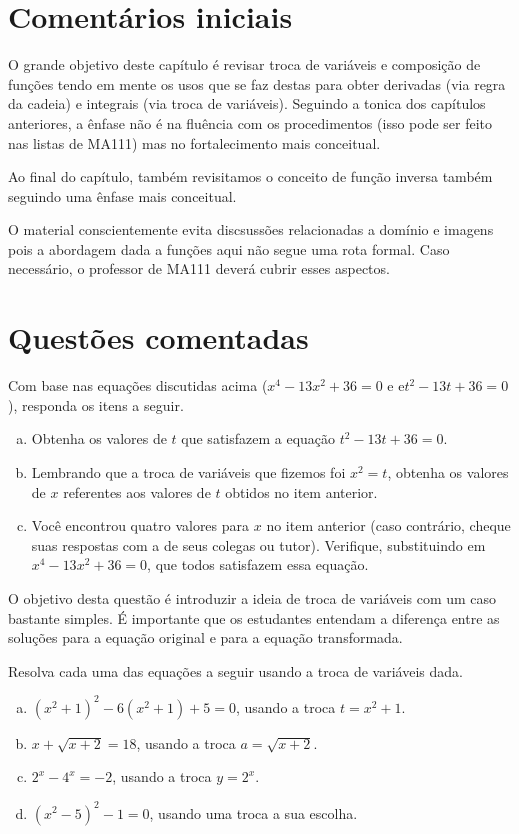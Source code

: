 \documentclass[main_estudante.tex]{subfiles}
\begin{document}
\section{Comentários iniciais}

O grande objetivo deste capítulo é revisar troca de variáveis e composição de funções tendo em mente os usos que se faz destas para obter derivadas (via regra da cadeia) e integrais (via troca de variáveis). Seguindo a tonica dos capítulos anteriores, a ênfase não é na fluência com os procedimentos (isso pode ser feito nas listas de MA111) mas no fortalecimento mais conceitual.

Ao final do capítulo, também revisitamos o conceito de função inversa também seguindo uma ênfase mais conceitual.

O material conscientemente evita discsussões relacionadas a domínio e imagens pois a abordagem dada a funções aqui não segue uma rota formal. Caso necessário, o professor de MA111 deverá cubrir esses aspectos.

\section{Questões comentadas}

\begin{questao}
Com base nas equações discutidas acima ($x^4-13x^2+36=0$ e e$t^2-13t+36=0$), responda os itens a seguir.
\begin{enumerate}[a)]
\item Obtenha os valores de $t$ que satisfazem a equação $t^2-13t+36=0$.
\item Lembrando que a troca de variáveis que fizemos foi $x^2=t$, obtenha os valores de $x$ referentes aos valores de $t$ obtidos no item anterior.
\item Você encontrou quatro valores para $x$ no item anterior (caso contrário, cheque suas respostas com a de seus colegas ou tutor). Verifique, substituindo em $x^4-13x^2+36=0$, que todos satisfazem essa equação.
\end{enumerate}
\end{questao}

O objetivo desta questão é introduzir a ideia de troca de variáveis com um caso bastante simples. É importante que os estudantes entendam a diferença entre as soluções para a equação original e para a equação transformada.

\begin{questao}
Resolva cada uma das equações a seguir usando a troca de variáveis dada.
\begin{enumerate}[a)]
\item $(x^2+1)^2-6(x^2+1)+5=0$, usando a troca $t=x^2+1$.
\item $x+\sqrt{x+2}=18$, usando a troca $a=\sqrt{x+2}$.
\item $2^x-4^x=-2$, usando a troca $y=2^x$.
\item $(x^2-5)^2-1=0$, usando uma troca a sua escolha.
\end{enumerate}
\end{questao}
\end{document}
